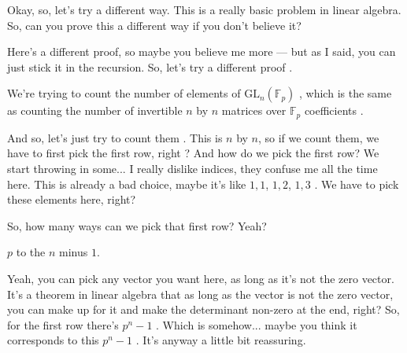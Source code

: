 \begin{proofWrapper}

\begin{speech}[01:22:06 - 01:23:27]
Okay, so, let's try a different way. This is a really basic problem in linear algebra. So, can you prove this a different way if you don't believe it? 

Here's a different proof, so maybe you believe me more --- but as I said, you can just stick it in the recursion. So, let's try a different proof .

We're trying to count the number of elements of $\mathrm{GL}_n(\mathbb{F}_p)$ , which is the same as counting the number of invertible $n$ by $n$ matrices over $\mathbb{F}_p$ coefficients .

And so, let's just try to count them . This is $n$ by $n$, so if we count them, we have to first pick the first row, right ? And how do we pick the first row? We start throwing in some... I really dislike indices, they confuse me all the time here. This is already a bad choice, maybe it's like $1, 1$, $1, 2$, $1, 3$ . We have to pick these elements here, right?

So, how many ways can we pick that first row? Yeah?
\end{speech}

\begin{student}
$p$ to the $n$ minus $1$.
\end{student}

\begin{speech}[01:23:29 - 01:24:12]
Yeah, you can pick any vector you want here, as long as it's not the zero vector. It's a theorem in linear algebra that as long as the vector is not the zero vector, you can make up for it and make the determinant non-zero at the end, right? So, for the first row there's $p^n - 1$ . Which is somehow... maybe you think it corresponds to this $p^n - 1$ . It's anyway a little bit reassuring.


\end{speech}
\end{proofWrapper}
